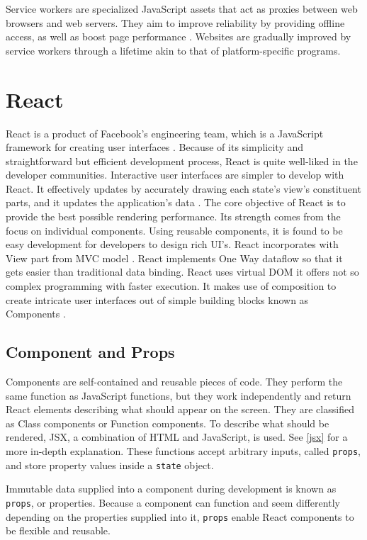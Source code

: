Service workers are specialized JavaScript assets that act as proxies between web browsers and web servers. They aim to improve reliability by providing offline access, as well as boost page performance \autocite{chrome2021service}. Websites are gradually improved by service workers through a lifetime akin to that of platform-specific programs.


\section{React}
\label{react}
React is a product of Facebook's engineering team, which is a JavaScript framework for creating user interfaces \autocite{gackenheimer2015introducing}. Because of its simplicity and straightforward but efficient development process, React is quite well-liked in the developer communities. Interactive user interfaces are simpler to develop with React. It effectively updates by accurately drawing each state's view's constituent parts, and it updates the application's data \autocite{islam2017reactjs}. The core objective of React is to provide the best possible rendering performance. Its strength comes from the focus on individual components. Using reusable components, it is found to be easy development for developers to design rich UI's. React incorporates with View part from MVC model \autocite{maratkar2021re}. React implements One Way dataflow so that it gets easier than traditional data binding. React uses virtual DOM it offers not so complex programming with faster execution. It makes use of composition to create intricate user interfaces out of simple building blocks known as Components \autocite{david2020building}.

\subsection{Component and Props}
Components are self-contained and reusable pieces of code. They perform the same function as JavaScript functions, but they work independently and return React elements describing what should appear on the screen. They are classified as Class components or Function components. To describe what should be rendered, JSX, a combination of HTML and JavaScript, is used. See \autoref{jsx} for a more in-depth explanation. These functions accept arbitrary inputs, called \texttt{props}, and store property values inside a \texttt{state} object.

Immutable data supplied into a component during development is known as \texttt{props}, or properties. Because a component can function and seem differently depending on the properties supplied into it, \texttt{props} enable React components to be flexible and reusable.

